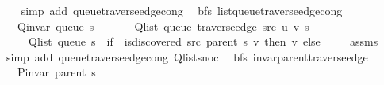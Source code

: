 \begin{isabellebody}
\ \ \isamarkupfalse%
\ {\isacharparenleft}{\kern0pt}simp\ add{\isacharcolon}{\kern0pt}\ queue{\isacharunderscore}{\kern0pt}traverse{\isacharunderscore}{\kern0pt}edge{\isacharunderscore}{\kern0pt}cong{\isacharparenright}{\kern0pt}%
\endisatagproof
{\isafoldproof}%
%
\isadelimproof
\isanewline
%
\endisadelimproof
\isanewline
{}\isamarkupfalse%
\ {\isacharparenleft}{\kern0pt}\ bfs{\isacharparenright}{\kern0pt}\ list{\isacharunderscore}{\kern0pt}queue{\isacharunderscore}{\kern0pt}traverse{\isacharunderscore}{\kern0pt}edge{\isacharunderscore}{\kern0pt}cong{\isacharcolon}{\kern0pt}\isanewline
\ \ \ {\isachardoublequoteopen}Q{\isacharunderscore}{\kern0pt}invar\ {\isacharparenleft}{\kern0pt}queue\ s{\isacharparenright}{\kern0pt}{\isachardoublequoteclose}\isanewline
\ \ \isanewline
\ \ \ \ {\isachardoublequoteopen}Q{\isacharunderscore}{\kern0pt}list\ {\isacharparenleft}{\kern0pt}queue\ {\isacharparenleft}{\kern0pt}traverse{\isacharunderscore}{\kern0pt}edge\ src\ u\ v\ s{\isacharparenright}{\kern0pt}{\isacharparenright}{\kern0pt}\ {\isacharequal}{\kern0pt}\isanewline
\ \ \ \ \ Q{\isacharunderscore}{\kern0pt}list\ {\isacharparenleft}{\kern0pt}queue\ s{\isacharparenright}{\kern0pt}\ {\isacharat}{\kern0pt}\ {\isacharparenleft}{\kern0pt}if\ {\isasymnot}\ is{\isacharunderscore}{\kern0pt}discovered\ src\ {\isacharparenleft}{\kern0pt}parent\ s{\isacharparenright}{\kern0pt}\ v\ then\ {\isacharbrackleft}{\kern0pt}v{\isacharbrackright}{\kern0pt}\ else\ {\isacharbrackleft}{\kern0pt}{\isacharbrackright}{\kern0pt}{\isacharparenright}{\kern0pt}{\isachardoublequoteclose}\isanewline
%
\isadelimproof
\ \ %
\endisadelimproof
%
\isatagproof
{}\isamarkupfalse%
\ assms\isanewline
\ \ \isamarkupfalse%
\ {\isacharparenleft}{\kern0pt}simp\ add{\isacharcolon}{\kern0pt}\ queue{\isacharunderscore}{\kern0pt}traverse{\isacharunderscore}{\kern0pt}edge{\isacharunderscore}{\kern0pt}cong\ Q{\isachardot}{\kern0pt}list{\isacharunderscore}{\kern0pt}snoc{\isacharparenright}{\kern0pt}%
\endisatagproof
{\isafoldproof}%
%
\isadelimproof
\isanewline
%
\endisadelimproof
%
\isadeliminvisible
\isanewline
%
\endisadeliminvisible
%
\isataginvisible
{}\isamarkupfalse%
\ {\isacharparenleft}{\kern0pt}\ bfs{\isacharparenright}{\kern0pt}\ invar{\isacharunderscore}{\kern0pt}parent{\isacharunderscore}{\kern0pt}traverse{\isacharunderscore}{\kern0pt}edge{\isacharcolon}{\kern0pt}\isanewline
\ \ \ {\isachardoublequoteopen}P{\isacharunderscore}{\kern0pt}invar\ {\isacharparenleft}{\kern0pt}parent\ s{\isacharparenright}{\kern0pt}{\isachardoublequoteclose}\isanewline

\end{isabellebody}
